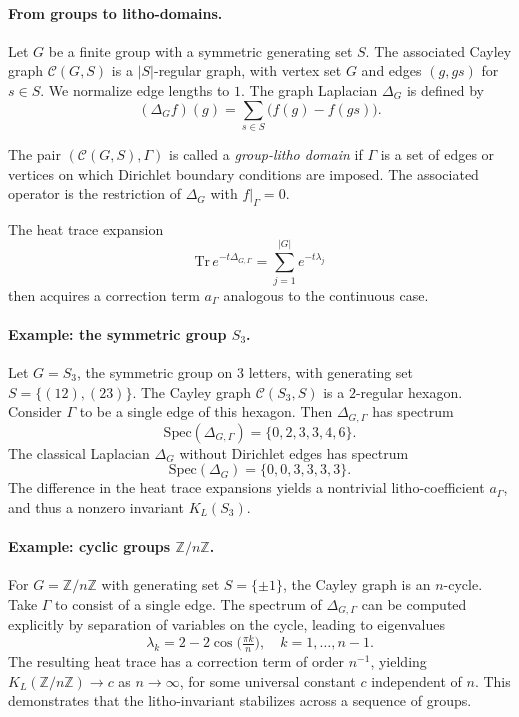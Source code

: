 \paragraph{From groups to litho-domains.}
Let $G$ be a finite group with a symmetric generating set $S$.
The associated Cayley graph $\mathcal{C}(G,S)$ is a $|S|$-regular graph,
with vertex set $G$ and edges $(g,gs)$ for $s\in S$.
We normalize edge lengths to $1$.
The graph Laplacian $\Delta_G$ is defined by
\[
(\Delta_G f)(g) = \sum_{s\in S} \big(f(g) - f(gs)\big).
\]

\begin{definition}
The pair $(\mathcal{C}(G,S),\Gamma)$ is called a \emph{group-litho domain}
if $\Gamma$ is a set of edges or vertices on which Dirichlet boundary
conditions are imposed. The associated operator is the restriction of
$\Delta_G$ with $f|_\Gamma=0$.
\end{definition}

The heat trace expansion
\[
\mathrm{Tr}\,e^{-t\Delta_{G,\Gamma}} = \sum_{j=1}^{|G|} e^{-t\lambda_j}
\]
then acquires a correction term $a_\Gamma$ analogous to the continuous case.

\paragraph{Example: the symmetric group $S_3$.}
Let $G=S_3$, the symmetric group on $3$ letters,
with generating set $S=\{(12),(23)\}$.
The Cayley graph $\mathcal{C}(S_3,S)$ is a $2$-regular hexagon.
Consider $\Gamma$ to be a single edge of this hexagon.
Then $\Delta_{G,\Gamma}$ has spectrum
\[
\mathrm{Spec}(\Delta_{G,\Gamma}) = \{0,2,3,3,4,6\}.
\]
The classical Laplacian $\Delta_G$ without Dirichlet edges has spectrum
\[
\mathrm{Spec}(\Delta_{G}) = \{0,0,3,3,3,3\}.
\]
The difference in the heat trace expansions yields a nontrivial litho-coefficient
$a_\Gamma$, and thus a nonzero invariant $K_L(S_3)$.

\paragraph{Example: cyclic groups $\mathbb{Z}/n\mathbb{Z}$.}
For $G=\mathbb{Z}/n\mathbb{Z}$ with generating set $S=\{\pm 1\}$,
the Cayley graph is an $n$-cycle.
Take $\Gamma$ to consist of a single edge.
The spectrum of $\Delta_{G,\Gamma}$ can be computed explicitly by separation
of variables on the cycle, leading to eigenvalues
\[
\lambda_k = 2 - 2\cos\Big(\tfrac{\pi k}{n}\Big), \quad k=1,\dots,n-1.
\]
The resulting heat trace has a correction term of order $n^{-1}$,
yielding $K_L(\mathbb{Z}/n\mathbb{Z}) \to c$ as $n\to\infty$,
for some universal constant $c$ independent of $n$.
This demonstrates that the litho-invariant stabilizes across a sequence
of groups.

